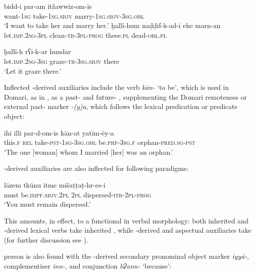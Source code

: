 \documentclass[output=paper]{langsci/langscibook}
\begin{document}
\ex
\gll bidd-i  par-am itžawwiz-om-is\\
     want-\textsc{1sg} take-\textsc{1sg.sbjv} marry-\textsc{1sg.sbjv-3sg.obl}\\
\glt ‘I want to take her and marry her.’
\z
\ex
\ea
\gll ḫallī-hum naḍḍif-k-ad-i ehe marn-an  \\
     let.\textsc{imp.2sg-3pl} clean-\textsc{tr-3pl-prog} these.\textsc{pl} dead-\textsc{obl.pl}\\

\ex
\gll ḫallī-h rʕi-k-ar hundar\\
     let.\textsc{imp.2sg}-\textsc{3sg} graze-\textsc{tr-3sg.sbjv} there\\
\glt ‘Let it graze there.’
\z
\z

Inflected -derived auxiliaries include the  verb \textit{kān-} ‘to be’, which is used in Domari, as in , as a past- and future- , supplementing the Domari remoteness or external past- marker \textit{-(y)a}, which follows the lexical predication or predicate object:

\ea \gll ihi illi par-d-om-is kān-at yatīm-ēy-a\\
     this.\textsc{f} \textsc{rel} take-\textsc{pst-1sg-3sg.obl} be.\textsc{prf-3sg.f} orphan-\textsc{pred.sg-pst}\\
\glt ‘The one [woman] whom I married [her] was an orphan.’ \label{ihi}
\z

\noindent {}-derived auxiliaries are also inflected for  following  paradigms:

\ea \gll   lāzem tkūnu itme mišaṭṭaṭ-hr-es-i\\
       must be.\textsc{impf.sbjv.2pl} \textsc{2pl} dispersed-\textsc{itr-2pl-prog}\\
\glt   ‘You must remain dispersed.’
\z

This amounts, in effect, to a functional  in verbal morphology: both inherited and -derived lexical verbs take inherited  , while -derived  and aspectual auxiliaries take   (for further discussion see \citealt{Matras2015}).

 person  is also found with the -derived secondary pronominal object marker \textit{iyyā-}, complementiser \textit{inn-}, and conjunction \textit{liʔann-} ‘because’:
\end{document}
